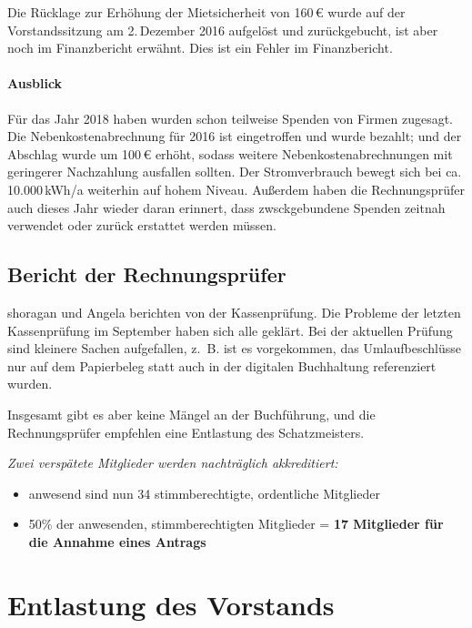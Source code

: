 \documentclass{s0minutes}
\begin{document}
Die Rücklage zur Erhöhung der Mietsicherheit von 160\,€ wurde auf der
Vorstandssitzung am 2.\,Dezember 2016 aufgelöst und zurückgebucht, ist aber noch
im Finanzbericht erwähnt. Dies ist ein Fehler im Finanzbericht.

\paragraph{Ausblick}
Für das Jahr 2018 haben wurden schon teilweise Spenden von Firmen zugesagt. Die
Nebenkostenabrechnung für 2016 ist eingetroffen und wurde bezahlt; und der
Abschlag wurde um 100\,€ erhöht, sodass weitere Nebenkostenabrechnungen mit
geringerer Nachzahlung ausfallen sollten. Der Stromverbrauch bewegt sich bei ca.
10.000\,kWh/a weiterhin auf hohem Niveau. Außerdem haben die Rechnungsprüfer
auch dieses Jahr wieder daran erinnert, dass zwsckgebundene Spenden zeitnah
verwendet oder zurück erstattet werden müssen.

\subsection{Bericht der Rechnungsprüfer}

shoragan und Angela berichten von der Kassenprüfung. Die Probleme der letzten
Kassenprüfung im September haben sich alle geklärt. Bei der aktuellen Prüfung
sind kleinere Sachen aufgefallen, z.~B. ist es vorgekommen, das Umlaufbeschlüsse
nur auf dem Papierbeleg statt auch in der digitalen Buchhaltung referenziert
wurden.

Insgesamt gibt es aber keine Mängel an der Buchführung, und die Rechnungsprüfer
empfehlen eine Entlastung des Schatzmeisters.

{ \itshape \vspace{\baselineskip}
  Zwei verspätete Mitglieder werden nachträglich akkreditiert:
  \begin{itemize}[nosep]
    \item anwesend sind nun 34 stimmberechtigte, ordentliche Mitglieder
    \item 50\% der anwesenden, stimmberechtigten Mitglieder =
      \textbf{17 Mitglieder für die Annahme eines Antrags}
  \end{itemize}
}

\section{Entlastung des Vorstands}
\end{document}
